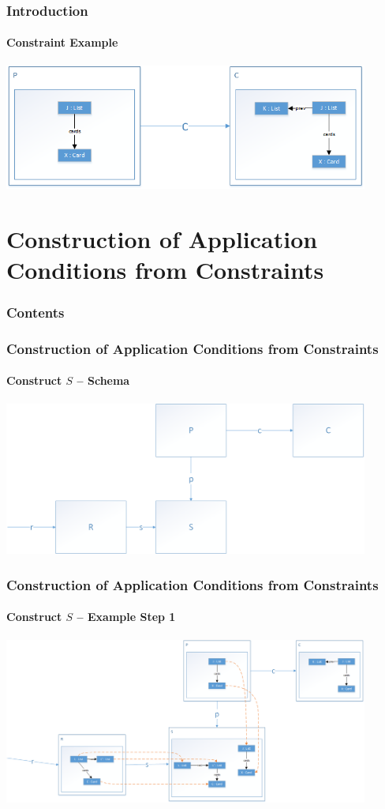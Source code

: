\documentclass[32pt,t]{beamer}
\begin{document}
	\begin{frame}
		\frametitle{Introduction}
		\framesubtitle{Constraint Example}
		\centering
		\includegraphics[width=12cm]{Images/01_Constraint_Example}
	\end{frame}

\section{Construction of Application Conditions from Constraints}
	\begin{frame}
		\frametitle{Contents}
		\tableofcontents[currentsection]
	\end{frame}

	\begin{frame}
		\frametitle{Construction of Application Conditions from Constraints}
		\framesubtitle{Construct $S$ -- Schema}
		\centering
		\includegraphics[width=12cm]{Images/10_Construct_S_Schema}
	\end{frame}

	\begin{frame}
		\frametitle{Construction of Application Conditions from Constraints}
		\framesubtitle{Construct $S$ -- Example Step 1}
		\centering
		\includegraphics[width=12cm]{Images/11_Construct_S_Example_Step1}
	\end{frame}
	
\end{document}
